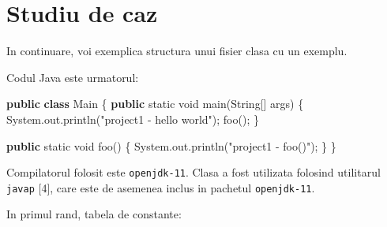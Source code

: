 \documentclass[]{article}
\newenvironment{Shaded}{}{}
\newcommand{\KeywordTok}[1]{\textcolor[rgb]{0.00,0.44,0.13}{\textbf{#1}}}
\newcommand{\DataTypeTok}[1]{\textcolor[rgb]{0.56,0.13,0.00}{#1}}
\newcommand{\StringTok}[1]{\textcolor[rgb]{0.25,0.44,0.63}{#1}}
\newcommand{\FunctionTok}[1]{\textcolor[rgb]{0.02,0.16,0.49}{#1}}
\newcommand{\BuiltInTok}[1]{#1}
\newcommand{\NormalTok}[1]{#1}
\begin{document}
\section{Studiu de caz}\label{studiu-de-caz}

In continuare, voi exemplica structura unui fisier clasa cu un exemplu.

Codul Java este urmatorul:

\begin{Shaded}
	\begin{Highlighting}[]
		\KeywordTok{public} \KeywordTok{class}\NormalTok{ Main \{}
		\KeywordTok{public} \DataTypeTok{static} \DataTypeTok{void} \FunctionTok{main}\NormalTok{(}\BuiltInTok{String}\NormalTok{[] args) \{}
		\BuiltInTok{System}\NormalTok{.}\FunctionTok{out}\NormalTok{.}\FunctionTok{println}\NormalTok{(}\StringTok{"project1 - hello world"}\NormalTok{);}
		\FunctionTok{foo}\NormalTok{();}
		\NormalTok{    \}}

		\KeywordTok{public} \DataTypeTok{static} \DataTypeTok{void} \FunctionTok{foo}\NormalTok{() \{}
		\BuiltInTok{System}\NormalTok{.}\FunctionTok{out}\NormalTok{.}\FunctionTok{println}\NormalTok{(}\StringTok{"project1 - foo()"}\NormalTok{);}
		\NormalTok{    \}}
		\NormalTok{\}}
	\end{Highlighting}
\end{Shaded}

Compilatorul folosit este \texttt{openjdk-11}. Clasa a fost utilizata
folosind utilitarul \texttt{javap} {[}4{]}, care este de asemenea inclus
in pachetul \texttt{openjdk-11}.

In primul rand, tabela de constante:
\end{document}

